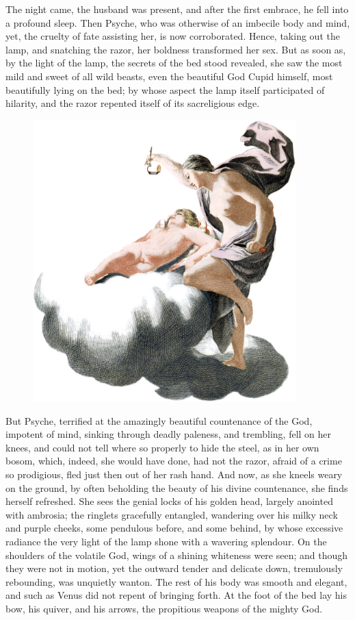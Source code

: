 \documentclass{article}
\begin{document}
The night came, the husband was present, and after the first embrace, he fell
into a profound sleep. Then Psyche, who was otherwise of an imbecile body and
mind, yet, the cruelty of fate assisting her, is now corroborated. Hence,
taking out the lamp, and snatching the razor, her boldness transformed her sex.
But as soon as, by the light of the lamp, the secrets of the bed stood
revealed, she saw the most mild and sweet of all wild beasts, even the
beautiful God Cupid himself, most beautifully lying on the bed; by whose aspect
the lamp itself participated of hilarity, and the razor repented itself of its
sacreligious edge.

\begin{figure}
\centering
\includegraphics[width=288pt]{apuleius_cupid_and_psyche.png}
\end{figure}

But Psyche, terrified at the amazingly beautiful countenance of the God,
impotent of mind, sinking through deadly paleness, and trembling, fell on her
knees, and could not tell where so properly to hide the steel, as in her own
bosom, which, indeed, she would have done, had not the razor, afraid of a crime
so prodigious, fled just then out of her rash hand. And now, as she kneels
weary on the ground, by often beholding the beauty of his divine countenance,
she finds herself refreshed. She sees the genial locks of his golden head,
largely anointed with ambrosia; the ringlets gracefully entangled, wandering
over his milky neck and purple cheeks, some pendulous before, and some behind,
by whose excessive radiance the very light of the lamp shone with a wavering
splendour. On the shoulders of the volatile God, wings of a shining whiteness
were seen; and though they were not in motion, yet the outward tender and
delicate down, tremulously rebounding, was unquietly wanton. The rest of his
body was smooth and elegant, and such as Venus did not repent of bringing
forth. At the foot of the bed lay his bow, his quiver, and his arrows, the
propitious weapons of the mighty God.
\end{document}
